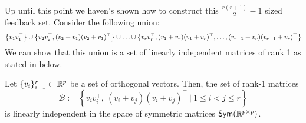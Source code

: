 Up until this point we haven's shown how to construct this $\frac{r(r+1)}{2}-1$ sized feedback set. 
Consider the following union:
\begin{align*}
    \left\{v_1v_1^{\top}\right\} \cup \left\{v_2v_2^{\top}, (v_2 + v_1)(v_2 + v_1)^{\top}\right\} \cup \ldots \cup \left\{v_rv_r^{\top}, (v_1 + v_r)(v_1 + v_r)^{\top},\ldots, (v_{r-1} + v_r)(v_{r-1} + v_r)^{\top}\right\}
\end{align*}
We can show that this union is a set of linearly independent matrices of rank 1 as stated in  below. 
\begingroup
\renewcommand\thelemma{\ref{lem: basis}} 
\begin{lemma}
     Let $\{v_i\}_{i=1}^r \subset \mathbb{R}^p$ be a set of orthogonal vectors. Then, the set of rank-1 matrices
    \[
    \mathcal{B} := \left\{v_i v_i^{\top},\ (v_i + v_j)(v_i + v_j)^{\top}\ \bigg| \ 1 \leq i < j \leq r \right\}
    \]
    is linearly independent in the space of symmetric matrices $\textsf{Sym}(\mathbb{R}^{p\times p})$.
\end{lemma}
\endgroup
